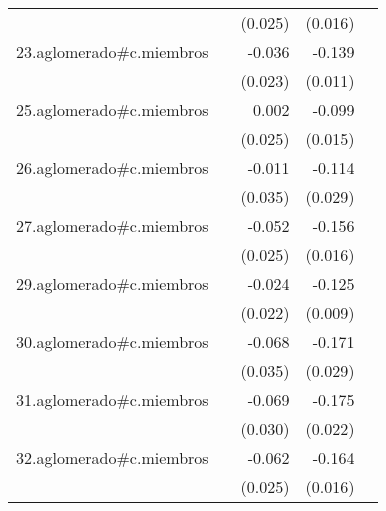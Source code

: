 {\begin{longtable}{l*{4}{D{.}{.}{-1}}}
            &                     &     (0.025)         &     (0.016)         &                     \\
\addlinespace
23.aglomerado#c.miembros&                     &      -0.036         &      -0.139\sym{***}&                     \\
            &                     &     (0.023)         &     (0.011)         &                     \\
\addlinespace
25.aglomerado#c.miembros&                     &       0.002         &      -0.099\sym{***}&                     \\
            &                     &     (0.025)         &     (0.015)         &                     \\
\addlinespace
26.aglomerado#c.miembros&                     &      -0.011         &      -0.114\sym{***}&                     \\
            &                     &     (0.035)         &     (0.029)         &                     \\
\addlinespace
27.aglomerado#c.miembros&                     &      -0.052\sym{*}  &      -0.156\sym{***}&                     \\
            &                     &     (0.025)         &     (0.016)         &                     \\
\addlinespace
29.aglomerado#c.miembros&                     &      -0.024         &      -0.125\sym{***}&                     \\
            &                     &     (0.022)         &     (0.009)         &                     \\
\addlinespace
30.aglomerado#c.miembros&                     &      -0.068         &      -0.171\sym{***}&                     \\
            &                     &     (0.035)         &     (0.029)         &                     \\
\addlinespace
31.aglomerado#c.miembros&                     &      -0.069\sym{*}  &      -0.175\sym{***}&                     \\
            &                     &     (0.030)         &     (0.022)         &                     \\
\addlinespace
32.aglomerado#c.miembros&                     &      -0.062\sym{*}  &      -0.164\sym{***}&                     \\
            &                     &     (0.025)         &     (0.016)         &                     \\

\end{longtable}}

